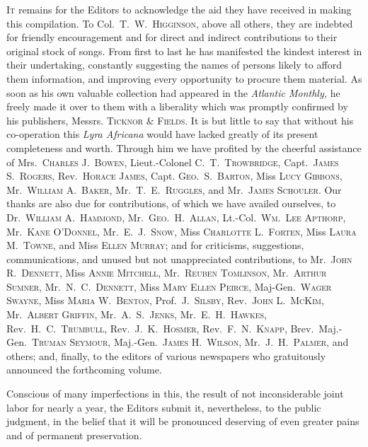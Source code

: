 \documentclass[a5paper,10pt]{book}
\begin{document}
\textsc{It} remains for the Editors to acknowledge the aid they have
received in making this compilation.  To
Col.~\textsc{T.~W.~Higginson}, above all others, they are indebted for
friendly encouragement and for direct and indirect contributions to
their original stock of songs.  From first to last he has manifested
the kindest interest in their undertaking, constantly suggesting the
names of persons likely to afford them information, and improving
every opportunity to procure them material.  As soon as his own
valuable collection had appeared in the \emph{Atlantic Monthly,} he
freely made it over to them with a liberality which was promptly
confirmed by his publishers, Messrs. \textsc{Ticknor \& Fields.}  It
is but little to say that without his co-operation this \emph{Lyra
  Africana} would have lacked greatly of its present completeness and
worth.  Through him we have profited by the cheerful assistance of
Mrs.~\textsc{Charles J.~Bowen,} Lieut.-Colonel
\textsc{C.~T.~Trowbridge,} Capt.~\textsc{James S.~Rogers,}
Rev.~\textsc{Horace James,} Capt. \textsc{Geo.~S.~Barton,} Miss
\textsc{Lucy Gibbons,} Mr.~\textsc{William A.~Baker,}
Mr.~\textsc{T.~E.~Ruggles,} and Mr.~\textsc{James Schouler.}  Our
thanks are also due for contributions, of which we have availed
ourselves, to Dr.~\textsc{William A.~Hammond,}
Mr.~\textsc{Geo.~H.~Allan,} Lt.-Col.~\textsc{Wm.~Lee Apthorp,}
Mr.~\textsc{Kane O'Donnel,} Mr.~\textsc{E.~J.~Snow,} Miss
\textsc{Charlotte L.~Forten,} Miss \textsc{Laura M.~Towne,} and Miss
\textsc{Ellen Murray;} and for criticisms, suggestions,
communications, and unused but not unappreciated contributions, to
Mr.~\textsc{John R.~Dennett,} Miss \textsc{Annie Mitchell,}
Mr.~\textsc{Reuben Tomlinson,} Mr.~\textsc{Arthur Sumner,}
Mr.~\textsc{N.~C.~Dennett,} Miss \textsc{Mary Ellen Peirce,}
Maj-Gen.~\textsc{Wager Swayne,} Miss \textsc{Maria W.~Benton,}
Prof.~\textsc{J.~Silsby,} Rev.~\textsc{John L.~McKim,}
Mr.~\textsc{Albert Griffin,} Mr.~\textsc{A.~S.~Jenks,}
Mr.~\textsc{E.~H.~Hawkes,} Rev.~\textsc{H.~C.~Trumbull,}
Rev.~\textsc{J.~K.~Hosmer,} Rev.~\textsc{F.~N.~Knapp,}
Brev.~Maj.-Gen.~\textsc{Truman Seymour,} Maj.-Gen.~\textsc{James
  H.~Wilson,} Mr.~\textsc{J.~H.~Palmer,} and others; and, finally, to
the editors of various newspapers who gratuitously announced the
forthcoming volume.

Conscious of many imperfections in this, the result of not
inconsiderable joint labor for nearly a year, the Editors submit it,
nevertheless, to the public judgment, in the belief that it will be
pronounced deserving of even greater pains and of permanent
preservation.
\end{document}
